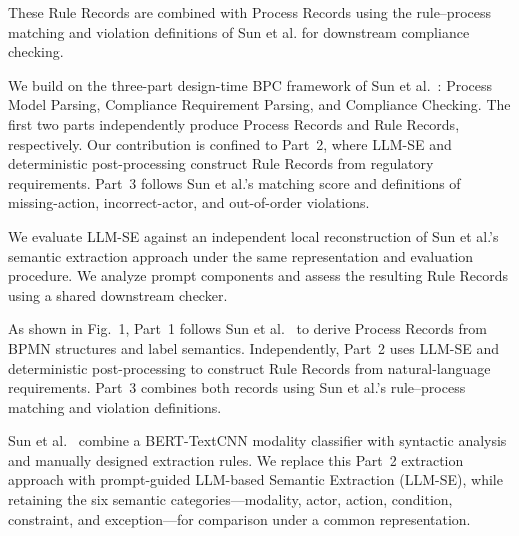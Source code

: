
These Rule Records are combined with Process Records using the rule--process matching and violation definitions of Sun et al. for downstream compliance checking.

We build on the three-part design-time BPC framework of Sun et al.~\cite{sun2024design}: Process Model Parsing, Compliance Requirement Parsing, and Compliance Checking. The first two parts independently produce Process Records and Rule Records, respectively. Our contribution is confined to Part~2, where LLM-SE and deterministic post-processing construct Rule Records from regulatory requirements. Part~3 follows Sun et al.'s matching score and definitions of missing-action, incorrect-actor, and out-of-order violations.

\item We evaluate LLM-SE against an independent local reconstruction of Sun et al.'s semantic extraction approach under the same representation and evaluation procedure. We analyze prompt components and assess the resulting Rule Records using a shared downstream checker.

As shown in Fig.~1, Part~1 follows Sun et al.~\cite{sun2024design} to derive Process Records from BPMN structures and label semantics. Independently, Part~2 uses LLM-SE and deterministic post-processing to construct Rule Records from natural-language requirements. Part~3 combines both records using Sun et al.'s rule--process matching and violation definitions.

Sun et al.~\cite{sun2024design} combine a BERT-TextCNN modality classifier with syntactic analysis and manually designed extraction rules. We replace this Part~2 extraction approach with prompt-guided LLM-based Semantic Extraction (LLM-SE), while retaining the six semantic categories---modality, actor, action, condition, constraint, and exception---for comparison under a common representation.


